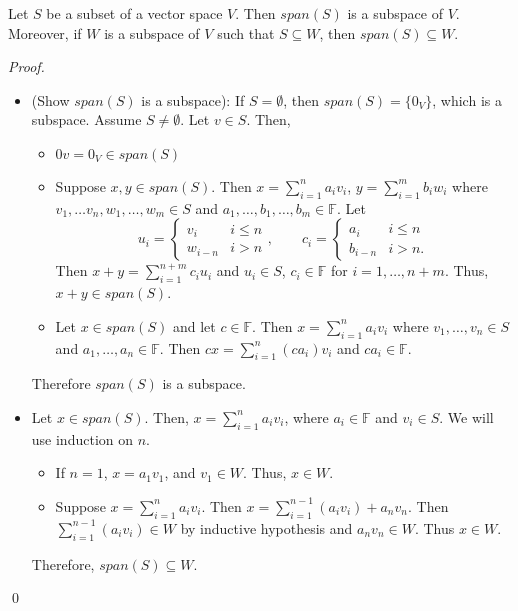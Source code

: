 \documentclass[12pt]{article}
\newenvironment{theorem}[2][Theorem]{\begin{trivlist}
\item[\hskip \labelsep {\bfseries #1}\hskip \labelsep {\bfseries #2.}]}{\end{trivlist}}
\newenvironment{sol}
    {\emph{Proof.}
    }
    {
    \qed
    }
\begin{document}
\begin{theorem}{1.5}
Let $S$ be a subset of a vector space $V$. Then $span(S)$ is a subspace of $V$. Moreover, if $W$ is a subspace of $V$ such that $S \subseteq W$, then $span(S) \subseteq W$.
\end{theorem}

\begin{sol}
\begin{itemize}
    \item[(1)] (Show $span(S)$ is a subspace): If $S = \emptyset$, then $span(S) = \{0_V\}$, which is a subspace. Assume $S \neq \emptyset$. Let $v \in S$. Then,
    \begin{itemize}
        \item[(a)] $0v = 0_V \in span(S)$
        \item[(b)] Suppose $x,y \in span(S)$. Then $x = \sum_{i = 1}^na_iv_i$, $y = \sum_{i = 1}^mb_iw_i$ where \\ $v_1, \dots v_n, w_1, \dots, w_m \in S$ and $a_1, \dots, b_1, \dots, b_m \in \mathbb{F}$. Let 
        $$u_i = 
        \begin{cases} 
            v_i & i \leq n \\
            w_{i-n} & i > n
        \end{cases}, \hspace{2em}
        c_i = 
        \begin{cases} 
            a_i & i \leq n \\
            b_{i-n} & i > n.
        \end{cases}$$
        Then $x + y = \sum_{i = 1}^{n + m}c_iu_i$ and $u_i \in S$, $c_i \in \mathbb{F}$ for $i = 1, \dots, n + m$. Thus, $x + y \in span(S)$.
        \item[(c)] Let $x \in span(S)$ and let $c \in \mathbb{F}$. Then $x = \sum_{i = 1}^na_iv_i$ where $v_1, \dots, v_n \in S$ and $a_1, \dots, a_n \in \mathbb{F}$. Then $cx = \sum_{i = 1}^n(ca_i)v_i$ and $ca_i \in \mathbb{F}$.
    \end{itemize}
    Therefore $span(S)$ is a subspace.
    \item[(2)] Let $x \in span(S)$. Then, $x = \sum_{i = 1}^na_iv_i$, where $a_i \in \mathbb{F}$ and $v_i \in S$. We will use induction on $n$.
    \begin{itemize}
        \item If $n = 1$, $x = a_1v_1$, and $v_1 \in W$. Thus, $x \in W$.
        \item Suppose $x = \sum_{i = 1}^na_iv_i$. Then $x = \sum_{i = 1}^{n - 1}(a_iv_i) + a_nv_n$. Then $\sum_{i = 1}^{n - 1}(a_iv_i) \in W$ by inductive hypothesis and $a_nv_n \in W$. Thus $x \in W$.
    \end{itemize}
    Therefore, $span(S) \subseteq W$.
\end{itemize}
\end{sol}
\end{document}
